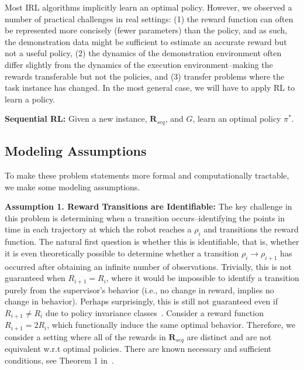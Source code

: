 Most IRL algorithms implicitly learn an optimal policy. However, we observed a number of practical challenges in real settings: (1) the reward function can often be represented more concisely (fewer parameters) than the policy, and as such, the demonstration data might be sufficient to estimate an accurate reward but not a useful policy, (2) the dynamics of the demonstration environment often differ slightly from the dynamics of the execution environment--making the rewards transferable but not the policies, and (3) transfer problems where the task instance has changed. 
In the most general case, we will have to apply RL to learn a policy.

\vspace{0.5em} \noindent \textbf{Sequential RL: } Given a new instance, $\mathbf{R}_{seq}$, and $G$, learn an optimal policy $\pi^*$.
\vspace{0.5em}

\subsection{Modeling Assumptions}
To make these problem statements more formal and computationally tractable, we make some modeling assumptions.

\vspace{0.5em}\noindent\textbf{Assumption 1. Reward Transitions are Identifiable: } The key challenge in this problem is determining when a transition occurs--identifying the points in time in each trajectory at which the robot reaches a $\rho_i$ and transitions the reward function. The natural first question is whether this is identifiable, that is, whether it is even theoretically possible to determine whether a transition $\rho_i \rightarrow \rho_{i+1}$ has occurred after obtaining an infinite number of observations. Trivially, this is not guaranteed when $R_{i+1} = R_{i}$, where it would be impossible to identify a transition purely from the supervisor's behavior (i.e., no change in reward, implies no change in behavior). Perhaps surprisingly, this is still not guaranteed even if $R_{i+1} \ne R_{i}$ due to policy invariance classes~\cite{DBLP:conf/icml/NgHR99}. Consider a reward function $R_{i+1} = 2R_{i}$, which functionally induce the same optimal behavior. Therefore, we consider a setting where all of the rewards in $\mathbf{R}_{seq}$ are distinct and are not equivalent w.r.t optimal policies.
There are known necessary and sufficient conditions, see Theorem 1 in~\cite{DBLP:conf/icml/NgHR99}.


